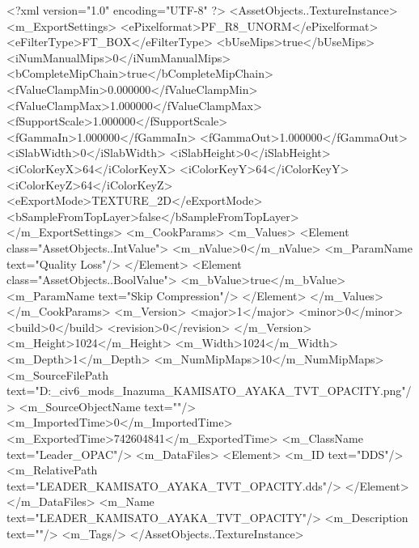 <?xml version="1.0" encoding="UTF-8" ?>
<AssetObjects..TextureInstance>
	<m_ExportSettings>
		<ePixelformat>PF_R8_UNORM</ePixelformat>
		<eFilterType>FT_BOX</eFilterType>
		<bUseMips>true</bUseMips>
		<iNumManualMips>0</iNumManualMips>
		<bCompleteMipChain>true</bCompleteMipChain>
		<fValueClampMin>0.000000</fValueClampMin>
		<fValueClampMax>1.000000</fValueClampMax>
		<fSupportScale>1.000000</fSupportScale>
		<fGammaIn>1.000000</fGammaIn>
		<fGammaOut>1.000000</fGammaOut>
		<iSlabWidth>0</iSlabWidth>
		<iSlabHeight>0</iSlabHeight>
		<iColorKeyX>64</iColorKeyX>
		<iColorKeyY>64</iColorKeyY>
		<iColorKeyZ>64</iColorKeyZ>
		<eExportMode>TEXTURE_2D</eExportMode>
		<bSampleFromTopLayer>false</bSampleFromTopLayer>
	</m_ExportSettings>
	<m_CookParams>
		<m_Values>
			<Element class="AssetObjects..IntValue">
				<m_nValue>0</m_nValue>
				<m_ParamName text="Quality Loss"/>
			</Element>
			<Element class="AssetObjects..BoolValue">
				<m_bValue>true</m_bValue>
				<m_ParamName text="Skip Compression"/>
			</Element>
		</m_Values>
	</m_CookParams>
	<m_Version>
		<major>1</major>
		<minor>0</minor>
		<build>0</build>
		<revision>0</revision>
	</m_Version>
	<m_Height>1024</m_Height>
	<m_Width>1024</m_Width>
	<m_Depth>1</m_Depth>
	<m_NumMipMaps>10</m_NumMipMaps>
	<m_SourceFilePath text="D:\Documents\GitHub\Uzuki_civ6_mods\Liyue_Inazuma\LEADER_KAMISATO_AYAKA_TVT_OPACITY.png"/>
	<m_SourceObjectName text=""/>
	<m_ImportedTime>0</m_ImportedTime>
	<m_ExportedTime>742604841</m_ExportedTime>
	<m_ClassName text="Leader_OPAC"/>
	<m_DataFiles>
		<Element>
			<m_ID text="DDS"/>
			<m_RelativePath text="LEADER_KAMISATO_AYAKA_TVT_OPACITY.dds"/>
		</Element>
	</m_DataFiles>
	<m_Name text="LEADER_KAMISATO_AYAKA_TVT_OPACITY"/>
	<m_Description text=""/>
	<m_Tags/>
</AssetObjects..TextureInstance>

